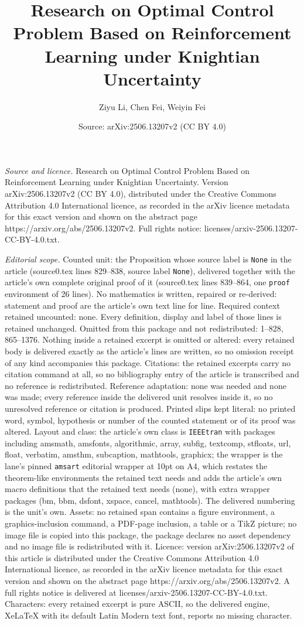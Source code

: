\documentclass[10pt,a4paper]{amsart}
\title[Research on Optimal Control Problem Based on Reinforcement L]{Research on Optimal Control Problem Based on Reinforcement Learning under Knightian Uncertainty}
\author{Ziyu Li, Chen Fei, Weiyin Fei}
\date{Source: arXiv:2506.13207v2 (CC BY 4.0)}
\begin{document}
\maketitle

\noindent\emph{Source and licence.} Research on Optimal Control Problem Based on Reinforcement Learning under Knightian Uncertainty. Version arXiv:2506.13207v2 (CC BY 4.0), distributed under the Creative Commons Attribution 4.0 International licence, as recorded in the arXiv licence metadata for this exact version and shown on the abstract page https://arxiv.org/abs/2506.13207v2. Full rights notice: licenses/arxiv-2506.13207-CC-BY-4.0.txt.\par\smallskip

\noindent\textit{Editorial scope.} Counted unit: the Proposition whose source label is \texttt{None} in the article (source0.tex lines 829--838, source label \texttt{None}), delivered together with the article's own complete original proof of it (source0.tex lines 839--864, one \texttt{proof} environment of 26 lines). No mathematics is written, repaired or re-derived: statement and proof are the article's own text line for line. Required context retained uncounted: none. Every definition, display and label of those lines is retained unchanged. Omitted from this package and not redistributed: 1--828, 865--1376. Nothing inside a retained excerpt is omitted or altered: every retained body is delivered exactly as the article's lines are written, so no omission receipt of any kind accompanies this package. Citations: the retained excerpts carry no citation command at all, so no bibliography entry of the article is transcribed and no reference is redistributed. Reference adaptation: none was needed and none was made; every reference inside the delivered unit resolves inside it, so no unresolved reference or citation is produced. Printed slips kept literal: no printed word, symbol, hypothesis or number of the counted statement or of its proof was altered. Layout and class: the article's own class is \texttt{IEEEtran} with packages including amsmath, amsfonts, algorithmic, array, subfig, textcomp, stfloats, url, float, verbatim, amsthm, subcaption, mathtools, graphicx; the wrapper is the lane's pinned \texttt{amsart} editorial wrapper at 10pt on A4, which restates the theorem-like environments the retained text needs and adds the article's own macro definitions that the retained text needs (none), with extra wrapper packages (bm, bbm, dsfont, xspace, cancel, mathtools). The delivered numbering is the unit's own. Assets: no retained span contains a figure environment, a graphics-inclusion command, a PDF-page inclusion, a table or a TikZ picture; no image file is copied into this package, the package declares no asset dependency and no image file is redistributed with it. Licence: version arXiv:2506.13207v2 of this article is distributed under the Creative Commons Attribution 4.0 International licence, as recorded in the arXiv licence metadata for this exact version and shown on the abstract page https://arxiv.org/abs/2506.13207v2. A full rights notice is delivered at licenses/arxiv-2506.13207-CC-BY-4.0.txt. Characters: every retained excerpt is pure ASCII, so the delivered engine, XeLaTeX with its default Latin Modern text font, reports no missing character.
\end{document}
